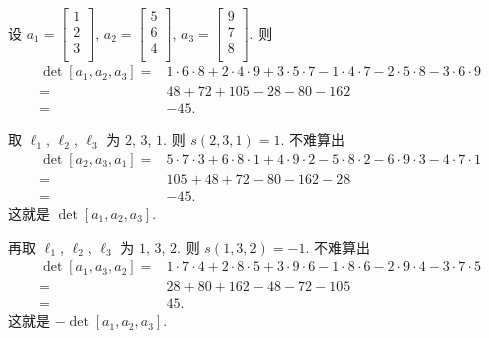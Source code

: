 \begin{example}
    设
    \(a_1 =  \begin{bmatrix}
        1 \\2\\3\\
    \end{bmatrix}\),
    \(a_2 =  \begin{bmatrix}
        5 \\6\\4\\
    \end{bmatrix}\),
    \(a_3 =  \begin{bmatrix}
        9 \\7\\8\\
    \end{bmatrix}\).
    则
    \begin{align*}
        \det {[a_1, a_2, a_3]}
        = {} &
        1 \cdot 6 \cdot 8
        + 2 \cdot 4 \cdot 9
        + 3 \cdot 5 \cdot 7
        - 1 \cdot 4 \cdot 7
        - 2 \cdot 5 \cdot 8
        - 3 \cdot 6 \cdot 9
        \\
        = {} &
        48 + 72 + 105 - 28 - 80 - 162
        \\
        = {} & {-45}.
    \end{align*}

    取 \(\ell_1\), \(\ell_2\), \(\ell_3\) 为 \(2\), \(3\), \(1\).
    则 \(s(2, 3, 1) = 1\).
    不难算出
    \begin{align*}
        \det {[a_2, a_3, a_1]}
        = {} &
        5 \cdot 7 \cdot 3
        + 6 \cdot 8 \cdot 1
        + 4 \cdot 9 \cdot 2
        - 5 \cdot 8 \cdot 2
        - 6 \cdot 9 \cdot 3
        - 4 \cdot 7 \cdot 1
        \\
        = {} &
        105 + 48 + 72 - 80 - 162 - 28
        \\
        = {} & {-45}.
    \end{align*}
    这就是 \(\det {[a_1, a_2, a_3]}\).

    再取 \(\ell_1\), \(\ell_2\), \(\ell_3\)
    为 \(1\), \(3\), \(2\).
    则 \(s(1, 3, 2) = -1\).
    不难算出
    \begin{align*}
        \det {[a_1, a_3, a_2]}
        = {} &
        1 \cdot 7 \cdot 4
        + 2 \cdot 8 \cdot 5
        + 3 \cdot 9 \cdot 6
        - 1 \cdot 8 \cdot 6
        - 2 \cdot 9 \cdot 4
        - 3 \cdot 7 \cdot 5
        \\
        = {} &
        28 + 80 + 162 - 48 - 72 - 105
        \\
        = {} & 45.
    \end{align*}
    这就是 \(-\det {[a_1, a_2, a_3]}\).
\end{example}


